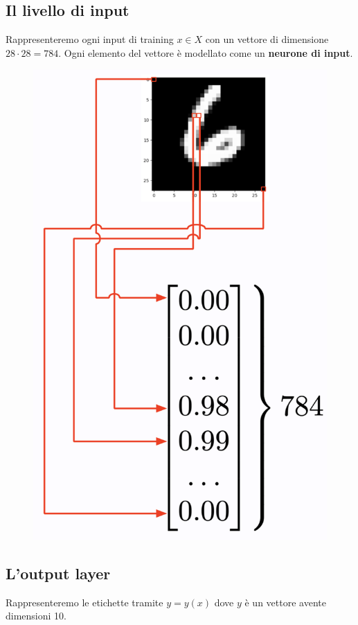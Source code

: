 \subsection{Il livello di input}
Rappresenteremo ogni input di training $x\in X$ con un vettore di dimensione $28\cdot 28=784$. Ogni elemento del vettore è modellato come un \textbf{neurone di input}.
\begin{figure}[!h]
    \includegraphics[scale=.35]{images/gradient_descent/input_layer.png}
    \centering
\end{figure}
\newpage
\subsection{L'output layer}
Rappresenteremo le etichette tramite $y=y(x)$ dove $y$ è un vettore avente dimensioni 10.



